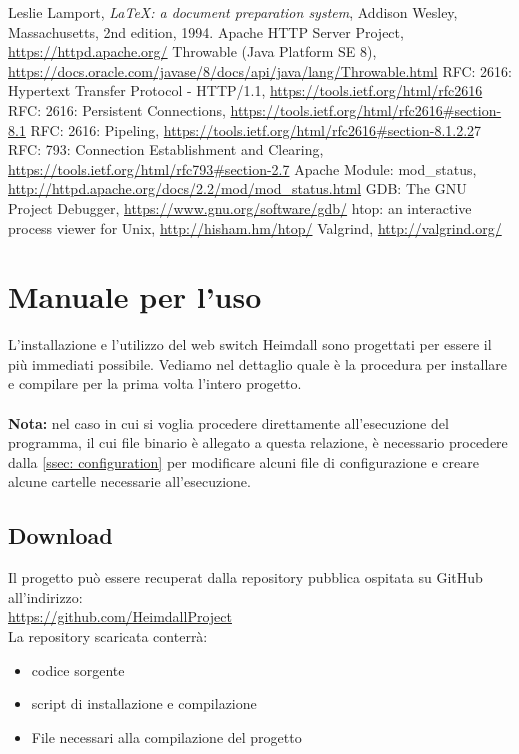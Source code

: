 \documentclass[italian]{tktltiki2}
\begin{document}
\newpage
%
%
\renewcommand{\refname}{\normalfont\selectfont\normalsize\textbf{Annotazioni}} 
\begin{thebibliography}{9}
  Leslie Lamport,
  \emph{\LaTeX: a document preparation system},
  Addison Wesley, Massachusetts,
  2nd edition,
  1994.
  Apache HTTP Server Project, \url{https://httpd.apache.org/}
  Throwable (Java Platform SE 8), \url{https://docs.oracle.com/javase/8/docs/api/java/lang/Throwable.html}
  RFC: 2616: Hypertext Transfer Protocol - HTTP/1.1, \url{https://tools.ietf.org/html/rfc2616}
  RFC: 2616: Persistent Connections, \url{https://tools.ietf.org/html/rfc2616#section-8.1}
  RFC: 2616: Pipeling, \url{https://tools.ietf.org/html/rfc2616#section-8.1.2.2}7
  RFC: 793: Connection Establishment and Clearing, \url{https://tools.ietf.org/html/rfc793#section-2.7}
  Apache Module: mod\_status, \url{http://httpd.apache.org/docs/2.2/mod/mod_status.html}
  GDB: The GNU Project Debugger, \url{https://www.gnu.org/software/gdb/}
  htop: an interactive process viewer for Unix, \url{http://hisham.hm/htop/}
  Valgrind, \url{http://valgrind.org/}
\end{thebibliography}

\newpage
\appendix
\newpage
\section{Manuale per l'uso}
L'installazione e l'utilizzo del web switch Heimdall sono progettati per essere il più immediati possibile. Vediamo nel dettaglio quale è la procedura per installare e compilare per la prima volta l'intero progetto. \\\\
\textbf{Nota:} nel caso in cui si voglia procedere direttamente all'esecuzione del programma, il cui file binario è allegato a questa relazione, è necessario procedere dalla \ref{ssec: configuration} per modificare alcuni file di configurazione e creare alcune cartelle necessarie all'esecuzione.
\subsection{Download}
Il progetto può essere recuperat dalla repository pubblica ospitata su GitHub all'indirizzo:\\
\url{https://github.com/HeimdallProject} \\
La repository scaricata conterrà:
\begin{itemize}
	\item codice sorgente
	\item script di installazione e compilazione
	\item File necessari alla compilazione del progetto
\end{itemize}
\end{document}
